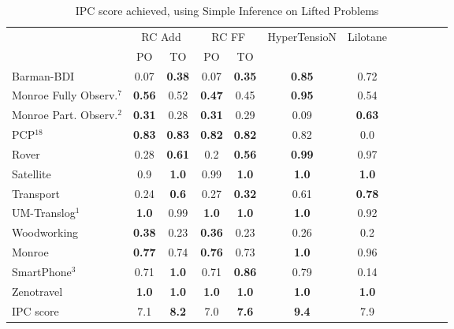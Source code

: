 \documentclass[letterpaper]{article} %
\begin{document}
\begin{table}
	\centering
	\caption{IPC score achieved, using Simple Inference on Lifted Problems}
	\label{table:LiftedSimpleIPC}
	\scalebox{0.7} {
\begin{tabular}{lccccccccccl} 
	\toprule 
	& \multicolumn{2}{c}{RC Add} & \multicolumn{2}{c}{RC FF} & HyperTensioN & Lilotane \\ 
	\cmidrule(lr){2-3} \cmidrule(lr){4-5} 
	&PO & TO & PO & TO  \\  
\midrule 
Barman-BDI & 0.07 & \textbf{0.38} & 0.07 & \textbf{0.35} & \textbf{0.85} & 0.72  \\ 
Monroe Fully Observ.$^{7}$ & \textbf{0.56} & 0.52 & \textbf{0.47} & 0.45 & \textbf{0.95} & 0.54  \\ 
Monroe Part. Observ.$^{2}$ & \textbf{0.31} & 0.28 & \textbf{0.31} & 0.29 & 0.09 & \textbf{0.63}  \\ 
PCP$^{18}$ & \textbf{0.83} & \textbf{0.83} & \textbf{0.82} & \textbf{0.82} & 0.82 & 0.0  \\ 
Rover & 0.28 & \textbf{0.61} & 0.2 & \textbf{0.56} & \textbf{0.99} & 0.97  \\ 
Satellite & 0.9 & \textbf{1.0} & 0.99 & \textbf{1.0} & \textbf{1.0} & \textbf{1.0}  \\ 
Transport & 0.24 & \textbf{0.6} & 0.27 & \textbf{0.32} & 0.61 & \textbf{0.78}  \\ 
UM-Translog$^{1}$ & \textbf{1.0} & 0.99 & \textbf{1.0} & \textbf{1.0} & \textbf{1.0} & 0.92  \\ 
Woodworking & \textbf{0.38} & 0.23 & \textbf{0.36} & 0.23 & 0.26 & 0.2  \\ 
\midrule 
Monroe & \textbf{0.77} & 0.74 & \textbf{0.76} & 0.73 & \textbf{1.0} & 0.96  \\ 
SmartPhone$^{3}$ & 0.71 & \textbf{1.0} & 0.71 & \textbf{0.86} & 0.79 & 0.14  \\ 
Zenotravel & \textbf{1.0} & \textbf{1.0} & \textbf{1.0} & \textbf{1.0} & \textbf{1.0} & \textbf{1.0}  \\ 
\midrule 
IPC score & 7.1 & \textbf{8.2} & 7.0 & \textbf{7.6} & \textbf{9.4} & 7.9  \\ 
\bottomrule 
\end{tabular} 
	}
\end{table} 
\end{document}
